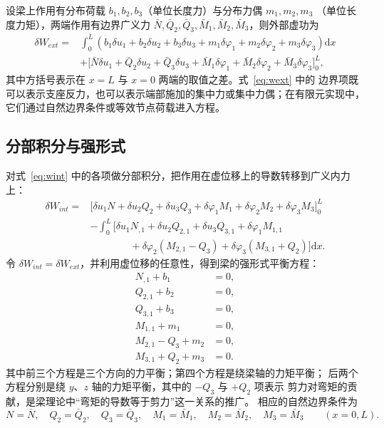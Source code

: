 \documentclass[UTF8,a4paper,11pt]{ctexart}
\newcommand{\ud}{\mathrm{d}}
\begin{document}
设梁上作用有分布荷载 $b_1,b_2,b_3$（单位长度力）与分布力偶 $m_1,m_2,m_3$
（单位长度力矩），两端作用有边界广义力 $\bar N,\bar Q_2,\bar Q_3,\bar M_1,
\bar M_2,\bar M_3$，则外部虚功为
\begin{equation}\label{eq:wext}
\boxed{
\begin{aligned}
\delta W_{ext}={}&\int_0^L\left(
b_1\delta u_1+b_2\delta u_2+b_3\delta u_3
+m_1\delta\varphi_1+m_2\delta\varphi_2+m_3\delta\varphi_3\right)\ud x\\
&+\Big[\bar N\delta u_1+\bar Q_2\delta u_2+\bar Q_3\delta u_3
+\bar M_1\delta\varphi_1+\bar M_2\delta\varphi_2+\bar M_3\delta\varphi_3\Big]_0^L,
\end{aligned}}
\end{equation}
其中方括号表示在 $x=L$ 与 $x=0$ 两端的取值之差。式~\eqref{eq:wext} 中的
边界项既可以表示支座反力，也可以表示端部施加的集中力或集中力偶；在有限元实现中，
它们通过自然边界条件或等效节点荷载进入方程。

\subsection{分部积分与强形式}

对式~\eqref{eq:wint} 中的各项做分部积分，把作用在虚位移上的导数转移到广义内力上：
\begin{equation}\label{eq:byparts}
\begin{aligned}
\delta W_{int}
={}&\Big[\delta u_1N+\delta u_2Q_2+\delta u_3Q_3
+\delta\varphi_1M_1+\delta\varphi_2M_2+\delta\varphi_3M_3\Big]_0^L\\
&-\int_0^L\Big[
\delta u_1N_{,1}+\delta u_2Q_{2,1}+\delta u_3Q_{3,1}
+\delta\varphi_1M_{1,1}\\
&\qquad\qquad
+\delta\varphi_2\left(M_{2,1}-Q_3\right)
+\delta\varphi_3\left(M_{3,1}+Q_2\right)\Big]\ud x.
\end{aligned}
\end{equation}
令 $\delta W_{int}=\delta W_{ext}$，并利用虚位移的任意性，得到梁的强形式平衡方程：
\begin{equation}\label{eq:strong}
\boxed{
\begin{aligned}
N_{,1}+b_1&=0,\\
Q_{2,1}+b_2&=0,\\
Q_{3,1}+b_3&=0,\\
M_{1,1}+m_1&=0,\\
M_{2,1}-Q_3+m_2&=0,\\
M_{3,1}+Q_2+m_3&=0.
\end{aligned}}
\end{equation}
其中前三个方程是三个方向的力平衡；第四个方程是绕梁轴的力矩平衡；
后两个方程分别是绕 $y$、$z$ 轴的力矩平衡，其中的 $-Q_3$ 与 $+Q_2$ 项表示
剪力对弯矩的贡献，是梁理论中“弯矩的导数等于剪力”这一关系的推广。
相应的自然边界条件为
\begin{equation}\label{eq:naturalBC}
N=\bar N,\quad Q_2=\bar Q_2,\quad Q_3=\bar Q_3,\quad
M_1=\bar M_1,\quad M_2=\bar M_2,\quad M_3=\bar M_3
\qquad (x=0,L).
\end{equation}
\end{document}
